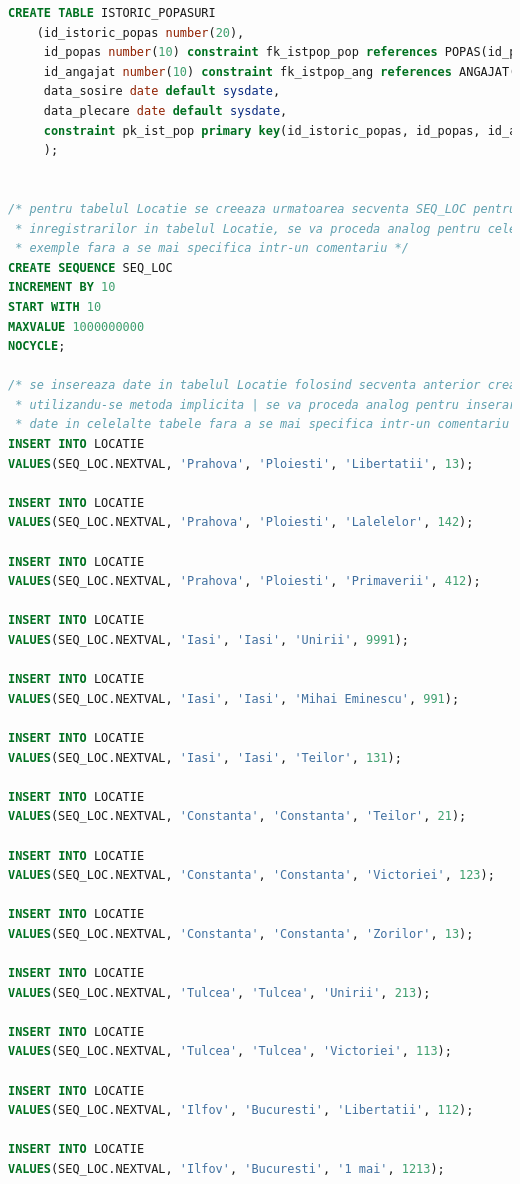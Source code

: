 \documentclass[12pt, a4paper]{article}
\begin{document}
\begin{lstlisting}[language=SQL]
CREATE TABLE ISTORIC_POPASURI
    (id_istoric_popas number(20),
     id_popas number(10) constraint fk_istpop_pop references POPAS(id_popas),
     id_angajat number(10) constraint fk_istpop_ang references ANGAJAT(id_angajat),
     data_sosire date default sysdate,
     data_plecare date default sysdate,
     constraint pk_ist_pop primary key(id_istoric_popas, id_popas, id_angajat, data_sosire)
     );


/* pentru tabelul Locatie se creeaza urmatoarea secventa SEQ_LOC pentru inserarea
 * inregistrarilor in tabelul Locatie, se va proceda analog pentru celelalte
 * exemple fara a se mai specifica intr-un comentariu */
CREATE SEQUENCE SEQ_LOC
INCREMENT BY 10
START WITH 10
MAXVALUE 1000000000
NOCYCLE;

/* se insereaza date in tabelul Locatie folosind secventa anterior creata
 * utilizandu-se metoda implicita | se va proceda analog pentru inserarea de
 * date in celelalte tabele fara a se mai specifica intr-un comentariu */
INSERT INTO LOCATIE
VALUES(SEQ_LOC.NEXTVAL, 'Prahova', 'Ploiesti', 'Libertatii', 13);

INSERT INTO LOCATIE
VALUES(SEQ_LOC.NEXTVAL, 'Prahova', 'Ploiesti', 'Lalelelor', 142);

INSERT INTO LOCATIE
VALUES(SEQ_LOC.NEXTVAL, 'Prahova', 'Ploiesti', 'Primaverii', 412);

INSERT INTO LOCATIE
VALUES(SEQ_LOC.NEXTVAL, 'Iasi', 'Iasi', 'Unirii', 9991);

INSERT INTO LOCATIE
VALUES(SEQ_LOC.NEXTVAL, 'Iasi', 'Iasi', 'Mihai Eminescu', 991);

INSERT INTO LOCATIE
VALUES(SEQ_LOC.NEXTVAL, 'Iasi', 'Iasi', 'Teilor', 131);

INSERT INTO LOCATIE
VALUES(SEQ_LOC.NEXTVAL, 'Constanta', 'Constanta', 'Teilor', 21);

INSERT INTO LOCATIE
VALUES(SEQ_LOC.NEXTVAL, 'Constanta', 'Constanta', 'Victoriei', 123);

INSERT INTO LOCATIE
VALUES(SEQ_LOC.NEXTVAL, 'Constanta', 'Constanta', 'Zorilor', 13);

INSERT INTO LOCATIE
VALUES(SEQ_LOC.NEXTVAL, 'Tulcea', 'Tulcea', 'Unirii', 213);

INSERT INTO LOCATIE
VALUES(SEQ_LOC.NEXTVAL, 'Tulcea', 'Tulcea', 'Victoriei', 113);

INSERT INTO LOCATIE
VALUES(SEQ_LOC.NEXTVAL, 'Ilfov', 'Bucuresti', 'Libertatii', 112);

INSERT INTO LOCATIE
VALUES(SEQ_LOC.NEXTVAL, 'Ilfov', 'Bucuresti', '1 mai', 1213);


\end{lstlisting}
\end{document}
